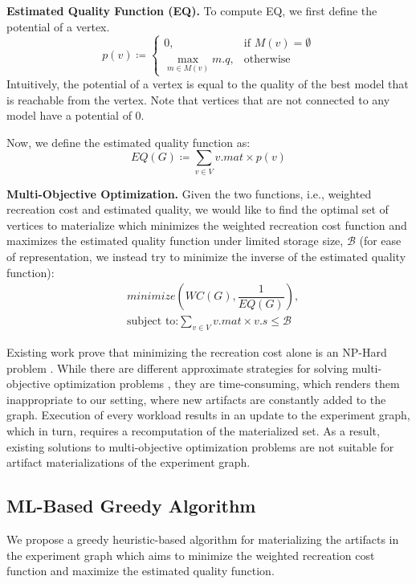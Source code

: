 \textbf{Estimated Quality Function (EQ).} 
To compute EQ, we first define the potential of a vertex.
\[
p(v) \coloneqq  
		\begin{cases}
		0 , & \text{if }M(v) = \emptyset  \\
		\max\limits_{m \in M(v)} m.q, & \text{otherwise}
		\end{cases}
\]
Intuitively, the potential of a vertex is equal to the quality of the best model that is reachable from the vertex.
Note that vertices that are not connected to any model have a potential of 0.

Now, we define the estimated quality function as:
\[
EQ(G) \coloneqq  \sum\limits_{v \in V}  v.mat \times p(v)
\]

\textbf{Multi-Objective Optimization.}
Given the two functions, i.e., weighted recreation cost and estimated quality, we would like to find the optimal set of vertices to materialize which minimizes the weighted recreation cost function and maximizes the estimated quality function under limited storage size, $\mathcal{B}$ (for ease of representation, we instead try to minimize the inverse of the estimated quality function):
\begin{equation}
\begin{split}
& minimize(WC(G), \dfrac{1}{EQ(G)}), \\
& \text{subject to:} \sum\limits_{v \in V} v.mat \times v.s \leq \mathcal{B}
\end{split}
\end{equation}

Existing work prove that minimizing the recreation cost alone is an NP-Hard problem \cite{bhattacherjee2015principles}.
While there are different approximate strategies for solving multi-objective optimization problems \cite{coello2007evolutionary}, they are time-consuming, which renders them inappropriate to our setting, where new artifacts are constantly added to the graph.
Execution of every workload results in an update to the experiment graph, which in turn, requires a recomputation of the materialized set.
As a result, existing solutions to multi-objective optimization problems are not suitable for artifact materializations of the experiment graph.

\subsection{ML-Based Greedy Algorithm}\label{subsec-ml-based-materialization}
We propose a greedy heuristic-based algorithm for materializing the artifacts in the experiment graph which aims to minimize the weighted recreation cost function and maximize the estimated quality function.

